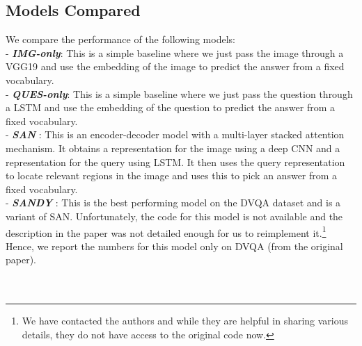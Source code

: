 \documentclass[10pt,twocolumn,letterpaper]{article}
\begin{document}
\subsection{Models Compared}
We compare the performance of the following models:\\
\noindent - \textit{\textbf{IMG-only}}: This is a simple baseline where we just pass the image through a VGG19 and use the embedding of the image to predict the answer from a fixed vocabulary.\\
\noindent - \textit{\textbf{QUES-only}}: This is a simple baseline where we just pass the question through a LSTM and use the embedding of the question to predict the answer from a fixed vocabulary.\\ 
\noindent - \textit{\textbf{SAN}} \cite{SAN}: This is an encoder-decoder model with a multi-layer stacked attention \cite{Attention} mechanism. It obtains a representation for the image using a deep CNN and a representation for the query using LSTM. It then uses the query representation to locate relevant regions in the image and uses this to pick an answer from a fixed vocabulary.\\
\noindent - \textit{\textbf{SANDY}} \cite{DVQA}: This is the best performing model on the DVQA dataset and is a variant of SAN. Unfortunately, the code for this model is not available and the description in the paper was not detailed enough for us to reimplement it.\footnote{We have contacted the authors and while they are helpful in sharing various details, they do not have access to the original code now.} Hence, we report the numbers for this model only on DVQA (from the original paper).\\
\\
\\
\end{document}
